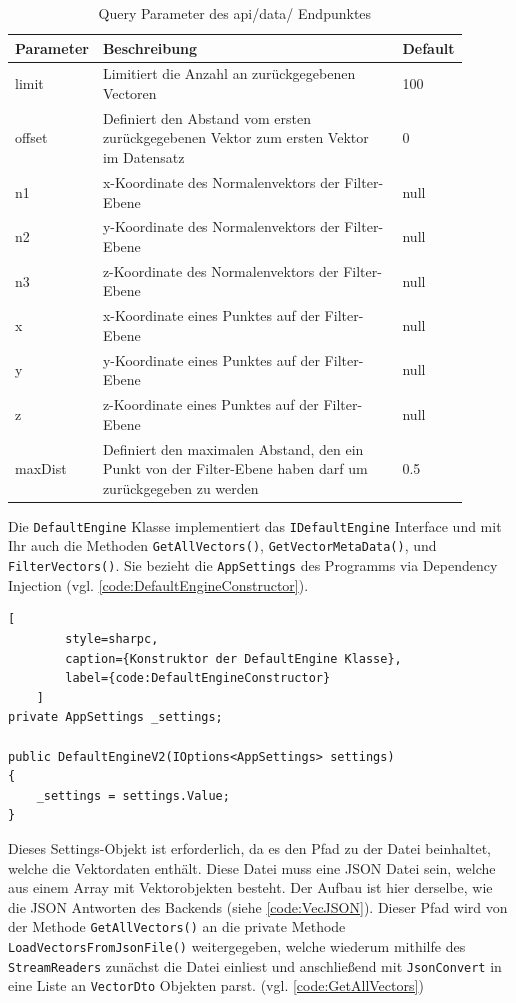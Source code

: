 \begin{table}
	\centering
	\begin{tabular}[h]{p{0.11\linewidth} | p{0.7\linewidth}| p{0.09\linewidth}}
	Parameter & Beschreibung & Default \\
	\hline
	limit & Limitiert die Anzahl an zurückgegebenen Vectoren & 100\\
	offset & Definiert den Abstand vom ersten zurückgegebenen Vektor zum ersten Vektor im Datensatz & 0\\
	n1 & x-Koordinate des Normalenvektors der Filter-Ebene & null\\
	n2 & y-Koordinate des Normalenvektors der Filter-Ebene & null\\
	n3 & z-Koordinate des Normalenvektors der Filter-Ebene & null\\
	x & x-Koordinate eines Punktes auf der Filter-Ebene & null\\
	y & y-Koordinate eines Punktes auf der Filter-Ebene & null\\
	z & z-Koordinate eines Punktes auf der Filter-Ebene & null\\
	maxDist & Definiert den maximalen Abstand, den ein Punkt von der Filter-Ebene haben darf um zurückgegeben zu werden & 0.5\\
	\end{tabular}
	\caption{Query Parameter des api/data/ Endpunktes}
	\label{tab:EndpointQueryParameters}
\end{table}

Die \texttt{DefaultEngine} Klasse implementiert das \texttt{IDefaultEngine} Interface
und mit Ihr auch die Methoden \texttt{GetAllVectors()}, \texttt{GetVectorMetaData()},
und \texttt{FilterVectors()}. Sie bezieht die \texttt{AppSettings} des Programms via
Dependency Injection (vgl. \lstlistingname\space \ref{code:DefaultEngineConstructor}).

\begin{codeblock}
	\begin{lstlisting}[
		style=sharpc,
		caption={Konstruktor der DefaultEngine Klasse},
		label={code:DefaultEngineConstructor}
	]
private AppSettings _settings;

public DefaultEngineV2(IOptions<AppSettings> settings)
{
	_settings = settings.Value;
}
	\end{lstlisting}
\end{codeblock}

Dieses Settings-Objekt ist erforderlich, da es den Pfad zu der Datei
beinhaltet, welche die Vektordaten enthält. Diese Datei muss eine JSON
Datei sein, welche aus einem Array mit Vektorobjekten besteht.
Der Aufbau ist hier derselbe, wie die JSON Antworten des Backends
(siehe \lstlistingname\space \ref{code:VecJSON}). Dieser Pfad wird von der Methode
\texttt{GetAllVectors()} an die private Methode
\texttt{LoadVectorsFromJsonFile()} weitergegeben, welche wiederum
mithilfe des \texttt{StreamReaders} zunächst die Datei einliest
und anschließend mit \texttt{JsonConvert} in eine Liste an
\texttt{VectorDto} Objekten parst. (vgl. \lstlistingname\space \ref{code:GetAllVectors})

